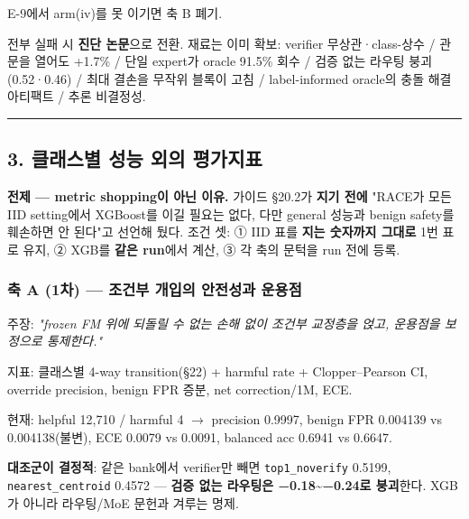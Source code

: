 \par\noindent \textbullet\enspace E-9에서 arm(iv)를 못 이기면 축 B 폐기.


\par\noindent \textbullet\enspace 전부 실패 시 \textbf{진단 논문}으로 전환. 재료는 이미 확보: verifier 무상관·class-상수 /\allowbreak{} 관문을 열어도 +\allowbreak{}1.7\% /\allowbreak{} 단일 expert가 oracle 91.5\% 회수 /\allowbreak{} 검증 없는 라우팅 붕괴(0.52·0.46) /\allowbreak{} 최대 결손을 무작위 블록이 고침 /\allowbreak{} label-informed oracle의 충돌 해결 아티팩트 /\allowbreak{} 추론 비결정성.



\medskip\hrule\medskip
\subsection{3. 클래스별 성능 외의 평가지표}
\textbf{전제 — metric shopping이 아닌 이유.} 가이드 §20.2가 \textbf{지기 전에} "RACE가 모든 IID setting에서 XGBoost를 이길 필요는 없다, 다만 general 성능과 benign safety를 훼손하면 안 된다"고 선언해 뒀다. 조건 셋: ① IID 표를 \textbf{지는 숫자까지 그대로} 1번 표로 유지, ② XGB를 \textbf{같은 run}에서 계산, ③ 각 축의 문턱을 run 전에 등록.

\subsubsection{축 A (1차) — 조건부 개입의 안전성과 운용점}
주장: \emph{"frozen FM 위에 되돌릴 수 없는 손해 없이 조건부 교정층을 얹고, 운용점을 보정으로 통제한다."}

\par\noindent \textbullet\enspace 지표: 클래스별 4-way transition(§22) +\allowbreak{} harmful rate +\allowbreak{} Clopper–Pearson CI, override precision, benign FPR 증분, net correction/\allowbreak{}1M, ECE.


\par\noindent \textbullet\enspace 현재: helpful 12,710 /\allowbreak{} harmful 4  \ensuremath{\rightarrow}  precision 0.9997, benign FPR 0.004139 vs 0.004138(불변), ECE 0.0079 vs 0.0091, balanced acc 0.6941 vs 0.6647.


\par\noindent \textbullet\enspace \textbf{대조군이 결정적}: 같은 bank에서 verifier만 빼면 \texttt{top1\_\allowbreak{}\allowbreak{}nov\allowbreak{}erify} 0.5199, \texttt{nearest\_\allowbreak{}\allowbreak{}centroid\allowbreak{}} 0.4572 — \textbf{검증 없는 라우팅은 −0.18\textasciitilde{}−0.24로 붕괴}한다. XGB가 아니라 라우팅/\allowbreak{}MoE 문헌과 겨루는 명제.


